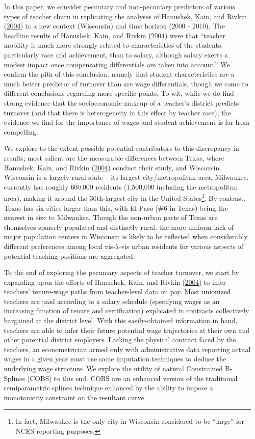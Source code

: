 \documentclass[12pt,]{article}
\let\rmarkdownfootnote\footnote%
\def\footnote{\protect\rmarkdownfootnote}
\begin{document}
In this paper, we consider pecuniary and non-pecuniary predictors of
various types of teacher churn in replicating the analyses of Hanushek,
Kain, and Rivkin (\protect\hyperlink{ref-hanushek}{2004}) in a new
context (Wisconsin) and time horizon (2000 - 2010). The headline results
of Hanushek, Kain, and Rivkin (\protect\hyperlink{ref-hanushek}{2004})
were that ``teacher mobility is much more strongly related to
characteristics of the students, particularly race and achievement, than
to salary, although salary exerts a modest impact once compensating
differentials are taken into account.'' We confirm the pith of this
conclusion, namely that student characteristics are a much better
predictor of turnover than are wage differentials, though we come to
different conclusions regarding more specific points. To wit, while we
do find strong evidence that the socioeconomic makeup of a teacher's
district predicts turnover (and that there is heterogeneity in this
effect by teacher race), the evidence we find for the importance of
wages and student achievement is far from compelling.

We explore to the extent possible potential contributors to this
discrepancy in results; most salient are the measurable differences
between Texas, where Hanushek, Kain, and Rivkin
(\protect\hyperlink{ref-hanushek}{2004}) conduct their study, and
Wisconsin. Wisconsin is a largely rural state -- its largest
city/metropolitan area, Milwaukee, currently has roughly 600,000
residents (1,500,000 including the metropolitan area), making it around
the 30th-largest city in the United States\footnote{In fact, Milwaukee
  is the only city in Wisconsin considered to be ``large'' for NCES
  reporting purposes.}. By contrast, Texas has six cities larger than
this, with El Paso (\#6 in Texas) being the nearest in size to
Milwaukee. Though the non-urban parts of Texas are themselves sparsely
populated and distinctly rural, the more uniform lack of major
population centers in Wisconsin is likely to be reflected when
considerably different preferences among local vis-à-vis urban residents
for various aspects of potential teaching positions are aggregated.

To the end of exploring the pecuniary aspects of teacher turnover, we
start by expanding upon the efforts of Hanushek, Kain, and Rivkin
(\protect\hyperlink{ref-hanushek}{2004}) to infer teachers' tenure-wage
paths from teacher-level data on pay. Most unionized teachers are paid
according to a salary schedule (specifying wages as an increasing
function of tenure and certification) explicated in contracts
collectively bargained at the district level. With this easily-obtained
information in hand, teachers are able to infer their future potential
wage trajectories at their own and other potential district employers.
Lacking the physical contract faced by the teachers, an econometrician
armed only with administrative data reporting actual wages in a given
year must use some imputation techniques to deduce the underlying wage
structure. We explore the utility of natural Constrained B-Splines
(COBS) to this end. COBS are an enhanced version of the traditional
semiparametric splines technique enhanced by the ability to impose a
monotonicity constraint on the resultant curve.
\end{document}
